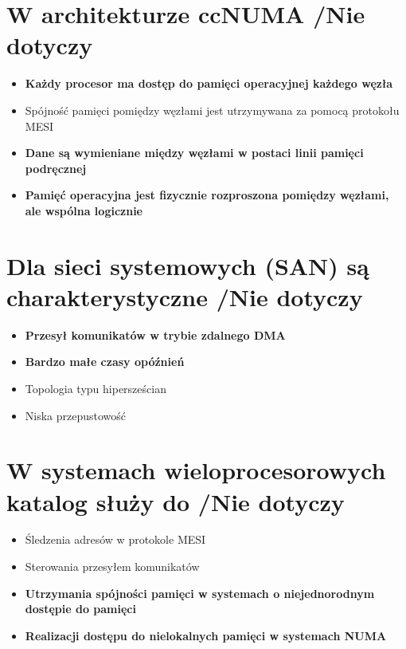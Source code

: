 \documentclass[a4paper,twoside]{article}
\begin{document}
\section{W architekturze ccNUMA {\small /Nie dotyczy}}
	\begin{itemize}
    \item \textbf{Każdy procesor ma dostęp do pamięci operacyjnej każdego węzła}
    \item Spójność pamięci pomiędzy węzłami jest utrzymywana za pomocą protokołu MESI
    \item \textbf{Dane są wymieniane między węzłami w postaci linii pamięci podręcznej}
    \item \textbf{Pamięć operacyjna jest fizycznie rozproszona pomiędzy węzłami, ale wspólna logicznie}
    \end{itemize}

\section{Dla sieci systemowych (SAN) są charakterystyczne {\small /Nie dotyczy}}
	\begin{itemize}
    \item \textbf{Przesył komunikatów w trybie zdalnego DMA}
    \item \textbf{Bardzo małe czasy opóźnień}
    \item Topologia typu hipersześcian
    \item Niska przepustowość
    \end{itemize}

\section{W systemach wieloprocesorowych katalog służy do {\small /Nie dotyczy}}
	\begin{itemize}
    \item Śledzenia adresów w protokole MESI
    \item Sterowania przesyłem komunikatów
    \item \textbf{Utrzymania spójności pamięci w systemach o niejednorodnym dostępie do pamięci}
    \item \textbf{Realizacji dostępu do nielokalnych pamięci w systemach NUMA}
    \end{itemize}
\end{document}
